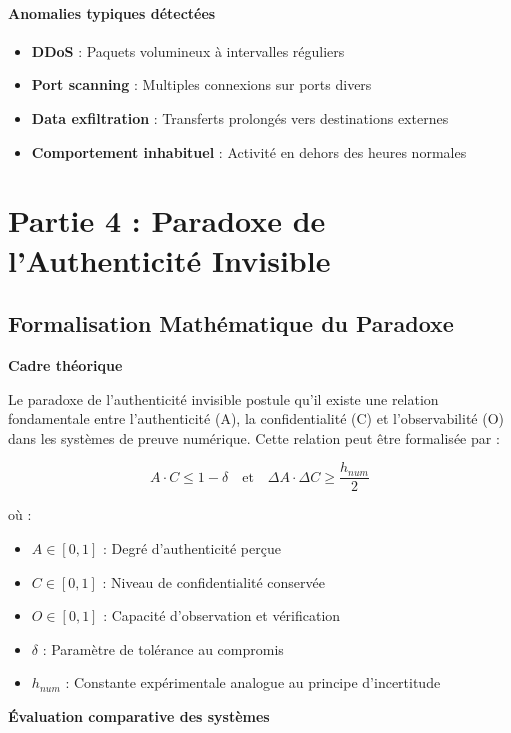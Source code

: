 \documentclass[12pt,a4paper]{article}
\begin{document}
\paragraph{Anomalies typiques détectées}
\begin{itemize}
\item \textbf{DDoS} : Paquets volumineux à intervalles réguliers
\item \textbf{Port scanning} : Multiples connexions sur ports divers
\item \textbf{Data exfiltration} : Transferts prolongés vers destinations externes
\item \textbf{Comportement inhabituel} : Activité en dehors des heures normales
\end{itemize}

\section{Partie 4 : Paradoxe de l'Authenticité Invisible}

\subsection{Formalisation Mathématique du Paradoxe}

\textbf{Cadre théorique}

Le paradoxe de l'authenticité invisible postule qu'il existe une relation fondamentale entre l'authenticité (A), la confidentialité (C) et l'observabilité (O) dans les systèmes de preuve numérique. Cette relation peut être formalisée par :

\[A \cdot C \leq 1 - \delta \quad \text{et} \quad \Delta A \cdot \Delta C \geq \frac{h_{num}}{2}\]

où :
\begin{itemize}
\item $A \in [0,1]$ : Degré d'authenticité perçue
\item $C \in [0,1]$ : Niveau de confidentialité conservée  
\item $O \in [0,1]$ : Capacité d'observation et vérification
\item $\delta$ : Paramètre de tolérance au compromis
\item $h_{num}$ : Constante expérimentale analogue au principe d'incertitude
\end{itemize}

\textbf{Évaluation comparative des systèmes}
\end{document}
